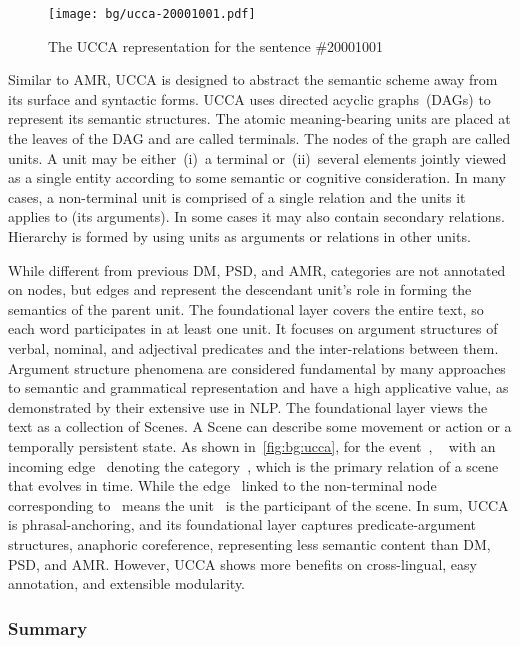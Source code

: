 \begin{figure}[!th]
\centering
\texttt{[image: bg/ucca-20001001.pdf]}
\caption{\label{fig:bg:ucca}The UCCA representation for the sentence
  \#20001001}
\end{figure}

Similar to AMR, UCCA is designed to abstract the semantic scheme away
from its surface and syntactic forms. UCCA uses directed acyclic
graphs~(DAGs) to represent its semantic structures. The atomic
meaning-bearing units are placed at the leaves of the DAG and are
called terminals. The nodes of the graph are called units. A unit may
be either~(i)~a terminal or~(ii)~several elements jointly viewed as a
single entity according to some semantic or cognitive
consideration. In many cases, a non-terminal unit is comprised of a
single relation and the units it applies to (its arguments). In some
cases it may also contain secondary relations. Hierarchy is formed by
using units as arguments or relations in other units.

While different from previous DM, PSD, and AMR, categories are not
annotated on nodes, but edges and represent the descendant unit's role
in forming the semantics of the parent unit. The foundational layer
covers the entire text, so each word participates in at least one
unit. It focuses on argument structures of verbal, nominal, and
adjectival predicates and the inter-relations between them. Argument
structure phenomena are considered fundamental by many approaches to
semantic and grammatical representation and have a high applicative
value, as demonstrated by their extensive use in NLP. The foundational
layer views the text as a collection of Scenes. A Scene can describe
some movement or action or a temporally persistent state. As shown
in~\autoref{fig:bg:ucca}, for the event~,
~ with an incoming edge~ denoting the
category~, which is the primary relation of a scene
that evolves in time. While the edge~ linked to the
non-terminal node corresponding to~ means the unit~ is the participant of
the scene. In sum, UCCA is phrasal-anchoring, and its foundational
layer captures predicate-argument structures, anaphoric coreference,
representing less semantic content than DM, PSD, and AMR. However,
UCCA shows more benefits on cross-lingual, easy annotation, and
extensible modularity.

\subsubsection{Summary}
\label{ssec:bg:summary-broad-coverage}

